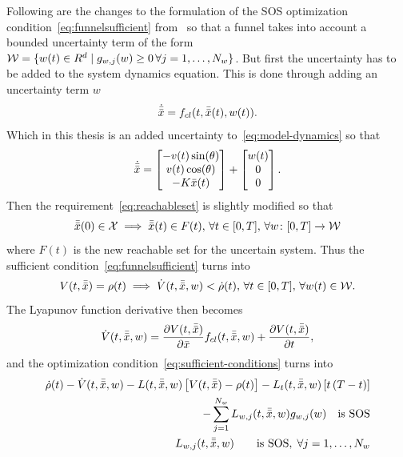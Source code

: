 Following are the changes to the formulation of the \ac{SOS} optimization
condition~\cref{eq:funnelsufficient} from~\cite{majumdarRobustOnlineMotion2013}
so that a funnel takes into account a bounded uncertainty term of the form
\(\mathcal{W} = \lbrace w(t) \in R^d \mid g_{w,j}(w) \geq 0\, \forall j =
  1,\ldots,N_w\rbrace\). But first the uncertainty has to be added to the system
dynamics equation. This is done through adding an uncertainty term \(w\)
\begin{equation}
  \dot{\bar{\bar{x}}} = f_{cl}(t, \bar{\bar{x}}(t), w(t)).
\end{equation}
Which in this thesis is an added uncertainty to~\cref{eq:model-dynamics} so that
\begin{equation}
  \dot{\bar{\x}} = %
  \begin{bmatrix}
    -v(t)\sin(\theta) \\
    v(t)\cos(\theta) \\
    -K\x (t) \\
  \end{bmatrix}
  +
  \begin{bmatrix}
    w(t) \\
    0 \\
    0
  \end{bmatrix}.
\end{equation}
Then the requirement~\cref{eq:reachableset} is slightly modified so that
\begin{equation}
  \label{eq:uncertain-reachableset}
  \bar{\bar{x}}(0) \in \mathcal{X} \implies \bar{\bar{x}}(t) \in F(t),\, \forall t \in
  [0,T], \, \forall w \colon [0,T] \rightarrow \mathcal{W}
\end{equation} 
where \(F(t)\) is the new reachable set for the uncertain system. Thus the
sufficient condition~\cref{eq:funnelsufficient} turns into
\begin{equation}
  \label{eq:funneluncertain-sufficient}
  V(t,\bar{\bar{x}}) = \rho(t) \implies \dot{V}(t,\bar{\bar{x}},w) < \dot{\rho}(t), \, \forall t \in [0,T], \, \forall w(t) \in \mathcal{W}.
\end{equation}
The Lyapunov function derivative then becomes
\begin{equation}
  \dot{V}(t,\bar{\bar{x}}, w) = \frac{\partial V(t,\bar{\bar{x}})}{\partial \bar{x}} f_{cl}(t,\bar{\bar{x}},w) + \frac{\partial V(t,\bar{\bar{x}})}{\partial t},
\end{equation}
and the optimization condition~\cref{eq:sufficient-conditions} turns into
\begin{align}
  \label{eq:optimizationconditionuncertain}
  \dot{\rho}(t) - \dot{V}(t,\bar{\bar{x}},w) - L(t,\bar{\bar{x}},w) \left[ V(t,\bar{\bar{x}}) - \rho(t) \right] - L_{t}(t,\bar{\bar{x}},w)\left[ t\left( T - t \right) \right]  & \nonumber \\
  - \sum_{j=1}^{N_{w}} L_{w,j}(t,\bar{\bar{x}},w)g_{w,j}(w) \quad \text{is SOS} &  \\
  L_{w,j}(t,\bar{\bar{x}},w) \qquad \text{is SOS}, \; \forall j = 1,\ldots,N_w \nonumber
\end{align}

